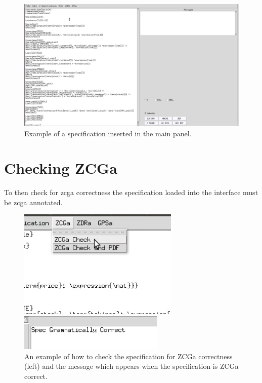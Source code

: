 \begin{figure}[H]
\includegraphics[scale=0.4]{Figures/Interface/specinserted.png}
\caption{Example of a specification inserted in the main panel. \label{fig:specinserted}}
\end{figure}

\section{Checking ZCGa}
To then check for \gls{zcga} correctness the specification loaded into the
interface must be \gls{zcga} annotated.

\begin{figure}[H]
\centering
\begin{minipage}{0.45\textwidth}
\centering
\includegraphics[scale=0.5]{Figures/Interface/zcgacheck.png}
\end{minipage}\hfill
\begin{minipage}{0.45\textwidth}
\centering
\includegraphics[scale=0.6]{Figures/Interface/zcgacorrect.png}
\end{minipage}
\caption{An example of how to check the specification for ZCGa correctness (left) and the message which appears when the specification is ZCGa correct.  \label{fig:zchecheck}}
\end{figure}

